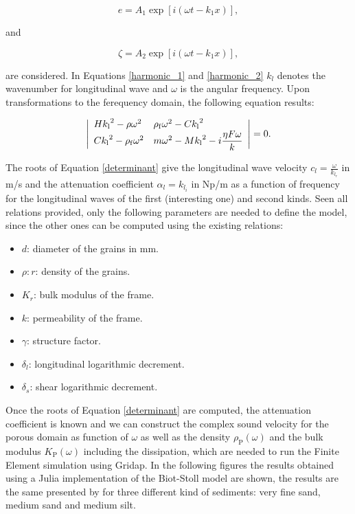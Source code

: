 \documentclass{article}[a4paper, 12pt]
\begin{document}
\begin{equation}\label{harmonic_1}
    e=A_{1} \exp[ i( \omega t-k_{1} x ) ],
\end{equation}

and 

\begin{equation}\label{harmonic_2}
    \zeta=A_{2} \exp[ i ( \omega t-k_{1} x ) ],
\end{equation}


are considered. In Equations \eqref{harmonic_1} and \eqref{harmonic_2} $k_l$ denotes the wavenumber for longitudinal wave and $\omega$ is the angular frequency. Upon transformations to the ferequency domain, the following equation results:

\begin{equation}\label{determinant}
    \left| \begin{array} {l l} {{H {k_{\mathrm{l}}}^{2}-\rho\omega^{2}}} & {{\rho_{\mathrm{f}} {\omega^{2}-C {k_{\mathrm{l}}}^{2}}}} \\ {{{C k_{\mathrm{l}}}^{2}-{\rho_{\mathrm{f}} \omega^{2}}}} & {{m {\omega^{2}-M {k_{\mathrm{l}}}^{2}-i} {\displaystyle \frac{\eta F \omega} {k}}}} \end{array} \right|=0.
\end{equation}

The roots of Equation \eqref{determinant} give the longitudinal wave velocity $c_l=\frac{\omega}{k_{l_r}}$ in m/s and the attenuation coefficient $\alpha_l=k_{l_i}$ in Np/m as a function of frequency for the longitudinal waves of the first (interesting one) and second kinds. Seen all relations provided, only the following parameters are needed to define the model, since the other ones can be computed using the existing relations:
\begin{itemize}
    \item $d$: diameter of the grains in mm.
    \item $\rho:r$: density of the grains.
    \item $K_r$: bulk modulus of the frame.
    \item $k$: permeability of the frame.
    \item $\gamma$: structure factor.
    \item $\delta_l$: longitudinal logarithmic decrement.
    \item $\delta_s$: shear logarithmic decrement.
\end{itemize}

Once the roots of Equation \eqref{determinant} are computed, the attenuation coefficient is known and we can construct the complex sound velocity for the porous domain as function of $\omega$ as well as the density $\rho_{\mathrm{P}}(\omega)$ and the bulk modulus $K_{\mathrm{P}}(\omega)$ including the dissipation, which are needed to run the Finite Element simulation using Gridap. In the following figures the results obtained using a Julia implementation of the Biot-Stoll model are shown, the results are the same presented by \cite{kimura2007study} for three different kind of sediments: very fine sand, medium sand and medium silt.
\end{document}
